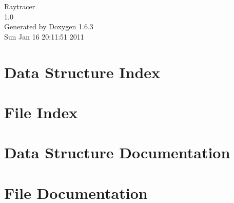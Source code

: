 \documentclass[a4paper]{book}
\begin{document}
\hypersetup{pageanchor=false}
\begin{titlepage}
\vspace*{7cm}
\begin{center}
{\Large Raytracer \\[1ex]\large 1.0 }\\
\vspace*{1cm}
{\large Generated by Doxygen 1.6.3}\\
\vspace*{0.5cm}
{\small Sun Jan 16 20:11:51 2011}\\
\end{center}
\end{titlepage}
\clearemptydoublepage
{}
\tableofcontents
\clearemptydoublepage
{}
\hypersetup{pageanchor=true}
\chapter{Data Structure Index}

\chapter{File Index}

\chapter{Data Structure Documentation}






























\chapter{File Documentation}
































\printindex
\end{document}
